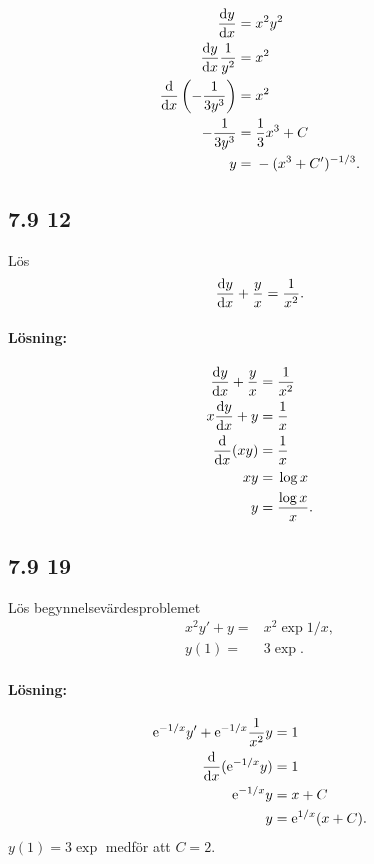 \begin{align*}
	\derivative{y}{x} ={}& x^2 y^2\\
	\derivative{y}{x} \frac{1}{y^2} ={}& x^2\\
	\derivative{}{x} \left( -\frac{1}{3 y^3} \right) ={}& x^2\\
	-\frac{1}{3 y^3} ={}& \frac{1}{3} x^3 + C\\
	y ={}& -(x^3 + C')^{-1/3}.
\end{align*}
	

\subsection{7.9 12}%
\label{sub:7_9_12}

Lös
\begin{align*}
	\derivative{y}{x} + \frac{y}{x} = \frac{1}{x^2}.
\end{align*}

\paragraph{Lösning:}

\begin{align*}
	\derivative{y}{x} + \frac{y}{x} ={}& \frac{1}{x^2}\\
	x \derivative{y}{x} + y ={}& \frac{1}{x}\\
	\derivative{}{x}{(x y)} ={}& \frac{1}{x}\\
	x y ={}& \log{x}\\
	y ={}& \frac{\log{x}}{x}.
\end{align*}


\subsection{7.9 19}

Lös begynnelsevärdesproblemet
\begin{align*}
	x^2 y' + y ={}& x^2 \exp{1/x},\\
	y(1) ={}& 3 \exp{}.
\end{align*}

\paragraph{Lösning:}

\begin{align*}
	\exp{-1/x} y' + \exp{-1/x} \frac{1}{x^2} y ={}& 1\\
	\derivative{}{x}{(\exp{-1/x} y)} ={}& 1\\
	\exp{-1/x} y ={}& x + C\\
	y ={}& \exp{1/x} (x + C).
\end{align*}
$y(1) = 3 \exp{}$ medför att $C = 2$.


